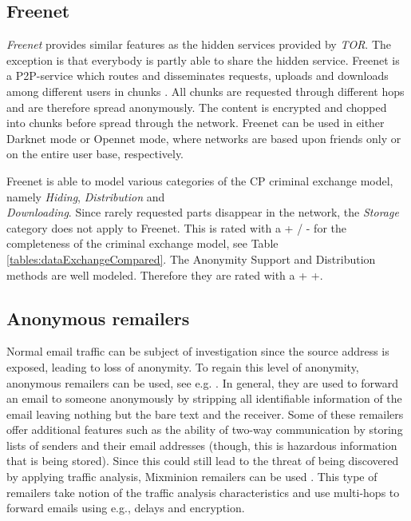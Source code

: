 \documentclass{sig-alternate-br}
\begin{document}
\subsection{Freenet}
\textit{Freenet} \cite{clarke2001freenet} provides similar features as the hidden services provided by \textit{TOR}. The exception is that everybody is partly able to share the hidden service. Freenet is a P2P-service which routes and disseminates requests, uploads and downloads among different users in chunks \cite{clarke2001freenet}. All chunks are requested through different hops and are therefore spread anonymously. The content is encrypted and chopped into chunks before spread through the network. Freenet can be used in either Darknet mode or Opennet mode, where networks are based upon friends only or on the entire user base, respectively.

Freenet is able to model various categories of the CP criminal exchange model, namely \textit{Hiding}, \textit{Distribution} and \\ \textit{Downloading}. Since rarely requested parts disappear in the network, the \textit{Storage} category does not apply to Freenet. This is rated with a + / - for the completeness of the criminal exchange model, see Table \ref{tables:dataExchangeCompared}. The Anonymity Support and Distribution methods are well modeled. Therefore they are rated with a + +.

\subsection{Anonymous remailers}
Normal email traffic can be subject of investigation since the source address is exposed, leading to loss of anonymity. To regain this level of anonymity, anonymous remailers can be used, see e.g. \cite{danezis2003mixminion}. In general, they are used to forward an email to someone anonymously by stripping all identifiable information of the email leaving nothing but the bare text and the receiver. Some of these remailers offer additional features such as the ability of two-way communication by storing lists of senders and their email addresses (though, this is hazardous information that is being stored). Since this could still lead to the threat of being discovered by applying traffic analysis, Mixminion remailers can be used \cite{danezis2003mixminion}. This type of remailers take notion of the traffic analysis characteristics and use multi-hops to forward emails using e.g., delays and encryption. 
\end{document}
